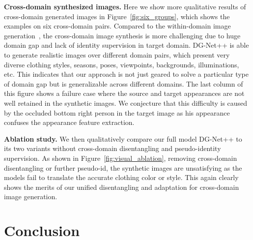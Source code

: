\documentclass[runningheads]{llncs}
\begin{document}
\noindent\textbf{Cross-domain synthesized images.} Here we show more qualitative results of cross-domain generated images in Figure~\ref{fig:six_groups}, which shows the examples on six cross-domain pairs. Compared to the within-domain image generation~\cite{ge2018fd,pose-normalized,zheng2019joint}, the cross-domain image synthesis is more challenging due to huge domain gap and lack of identity supervision in target domain. DG-Net++ is able to generate realistic images over different domain pairs, which present very diverse clothing styles, seasons, poses, viewpoints, backgrounds, illuminations, etc. This indicates that our approach is not just geared to solve a particular type of domain gap but is generalizable across different domains. The last column of this figure shows a failure case where the source and target appearances are not well retained in the synthetic images. We conjecture that this difficulty is caused by the occluded bottom right person in the target image as his appearance confuses the appearance feature extraction. 



\noindent\textbf{Ablation study.} We then qualitatively compare our full model DG-Net++ to its two variants without cross-domain disentangling and pseudo-identity supervision. As shown in Figure~\ref{fig:visual_ablation}, removing cross-domain disentangling or further pseudo-id, the synthetic images are unsatisfying as the models fail to translate the accurate clothing color or style. This again clearly shows the merits of our unified disentangling and adaptation for cross-domain image generation.  















\section{Conclusion}
\end{document}
